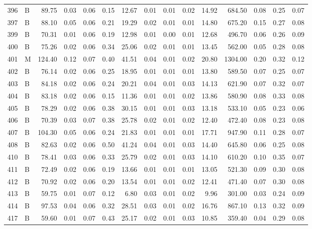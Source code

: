 \begin{table}[ht]
\begin{tabular}{rlrrrrrrrrrrrrr}
  396 & B & 89.75 & 0.03 & 0.06 & 0.15 & 12.67 & 0.01 & 0.01 & 0.02 & 14.92 & 684.50 & 0.08 & 0.25 & 0.07 \\ 
  397 & B & 88.10 & 0.05 & 0.06 & 0.21 & 19.29 & 0.02 & 0.01 & 0.01 & 14.80 & 675.20 & 0.15 & 0.27 & 0.08 \\ 
  399 & B & 70.31 & 0.01 & 0.06 & 0.19 & 12.98 & 0.01 & 0.00 & 0.01 & 12.68 & 496.70 & 0.06 & 0.26 & 0.09 \\ 
  400 & B & 75.26 & 0.02 & 0.06 & 0.34 & 25.06 & 0.02 & 0.01 & 0.01 & 13.45 & 562.00 & 0.05 & 0.28 & 0.08 \\ 
  401 & M & 124.40 & 0.12 & 0.07 & 0.40 & 41.51 & 0.04 & 0.01 & 0.02 & 20.80 & 1304.00 & 0.20 & 0.32 & 0.12 \\ 
  402 & B & 76.14 & 0.02 & 0.06 & 0.25 & 18.95 & 0.01 & 0.01 & 0.01 & 13.80 & 589.50 & 0.07 & 0.25 & 0.07 \\ 
  403 & B & 84.18 & 0.02 & 0.06 & 0.24 & 20.21 & 0.04 & 0.01 & 0.03 & 14.13 & 621.90 & 0.07 & 0.32 & 0.07 \\ 
  404 & B & 83.18 & 0.02 & 0.06 & 0.15 & 11.36 & 0.01 & 0.01 & 0.02 & 13.86 & 580.90 & 0.08 & 0.33 & 0.08 \\ 
  405 & B & 78.29 & 0.02 & 0.06 & 0.38 & 30.15 & 0.01 & 0.01 & 0.03 & 13.18 & 533.10 & 0.05 & 0.23 & 0.06 \\ 
  406 & B & 70.39 & 0.03 & 0.07 & 0.38 & 25.78 & 0.02 & 0.01 & 0.02 & 12.40 & 472.40 & 0.08 & 0.23 & 0.08 \\ 
  407 & B & 104.30 & 0.05 & 0.06 & 0.24 & 21.83 & 0.01 & 0.01 & 0.01 & 17.71 & 947.90 & 0.11 & 0.28 & 0.07 \\ 
  408 & B & 82.63 & 0.02 & 0.06 & 0.50 & 41.24 & 0.04 & 0.01 & 0.03 & 14.40 & 645.80 & 0.06 & 0.25 & 0.08 \\ 
  410 & B & 78.41 & 0.03 & 0.06 & 0.33 & 25.79 & 0.02 & 0.01 & 0.03 & 14.10 & 610.20 & 0.10 & 0.35 & 0.07 \\ 
  411 & B & 72.49 & 0.02 & 0.06 & 0.19 & 13.66 & 0.01 & 0.01 & 0.01 & 13.05 & 521.30 & 0.09 & 0.30 & 0.08 \\ 
  412 & B & 70.92 & 0.02 & 0.06 & 0.20 & 13.54 & 0.01 & 0.01 & 0.02 & 12.41 & 471.40 & 0.07 & 0.30 & 0.08 \\ 
  413 & B & 59.75 & 0.01 & 0.07 & 0.12 & 6.80 & 0.03 & 0.01 & 0.02 & 9.96 & 301.00 & 0.03 & 0.24 & 0.09 \\ 
  414 & B & 97.53 & 0.04 & 0.06 & 0.32 & 28.51 & 0.03 & 0.01 & 0.02 & 16.76 & 867.10 & 0.13 & 0.32 & 0.09 \\ 
  417 & B & 59.60 & 0.01 & 0.07 & 0.43 & 25.17 & 0.02 & 0.01 & 0.03 & 10.85 & 359.40 & 0.04 & 0.29 & 0.08 \\ 

\end{tabular}
\end{table}

